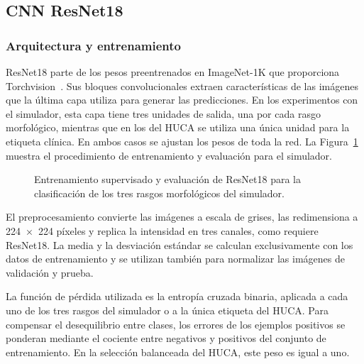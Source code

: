 \subsection{CNN ResNet18}
\label{chap:cnn_enfoque}

\subsubsection{Arquitectura y entrenamiento}
\label{sec:cnn_entrenamiento}

ResNet18 parte de los pesos preentrenados en ImageNet-1K que proporciona Torchvision~\cite{torchvisionresnet18}. Sus bloques convolucionales extraen características de las imágenes que la última capa utiliza para generar las predicciones. En los experimentos con el simulador, esta capa tiene tres unidades de salida, una por cada rasgo morfológico, mientras que en los del HUCA se utiliza una única unidad para la etiqueta clínica. En ambos casos se ajustan los pesos de toda la red. La Figura~\ref{fig:cnn_convolutional_pipeline} muestra el procedimiento de entrenamiento y evaluación para el simulador.

\begin{figure}[H]
  \centering
  \caption{Entrenamiento supervisado y evaluación de ResNet18 para la clasificación de los tres rasgos morfológicos del simulador.}
  \label{fig:cnn_convolutional_pipeline}
\end{figure}

El preprocesamiento convierte las imágenes a escala de grises, las redimensiona a 224~×~224 píxeles y replica la intensidad en tres canales, como requiere ResNet18. La media y la desviación estándar se calculan exclusivamente con los datos de entrenamiento y se utilizan también para normalizar las imágenes de validación y prueba.

\begin{samepage}
La función de pérdida utilizada es la entropía cruzada binaria, aplicada a cada uno de los tres rasgos del simulador o a la única etiqueta del HUCA. Para compensar el desequilibrio entre clases, los errores de los ejemplos positivos se ponderan mediante el cociente entre negativos y positivos del conjunto de entrenamiento. En la selección balanceada del HUCA, este peso es igual a uno.
\par
\end{samepage}

